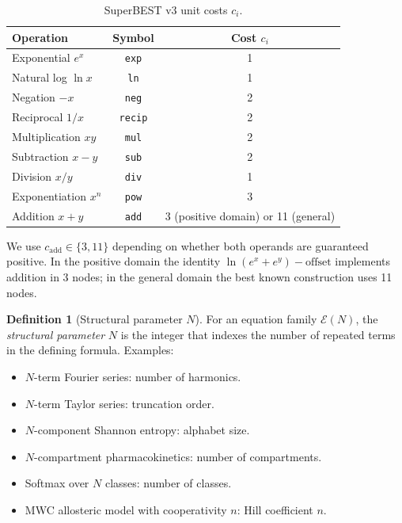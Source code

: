 \documentclass[12pt,a4paper]{article}
\theoremstyle{definition}
\newtheorem{definition}[theorem]{Definition}
\begin{document}
\begin{table}[h]
\centering
\caption{SuperBEST v3 unit costs $c_i$.}
\label{tab:superbest3}
\smallskip
\begin{tabular}{@{}lcc@{}}
\toprule
\textbf{Operation} & \textbf{Symbol} & \textbf{Cost $c_i$} \\
\midrule
Exponential $e^x$    & \texttt{exp}   & 1 \\
Natural log $\ln x$  & \texttt{ln}    & 1 \\
Negation $-x$        & \texttt{neg}   & 2 \\
Reciprocal $1/x$     & \texttt{recip} & 2 \\
Multiplication $xy$  & \texttt{mul}   & 2 \\
Subtraction $x-y$    & \texttt{sub}   & 2 \\
Division $x/y$       & \texttt{div}   & 1 \\
Exponentiation $x^n$ & \texttt{pow}   & 3 \\
Addition $x+y$       & \texttt{add}   & 3 (positive domain) or 11 (general) \\
\bottomrule
\end{tabular}
\end{table}

\noindent
We use $c_{\mathrm{add}} \in \{3, 11\}$ depending on whether both operands
are guaranteed positive.  In the positive domain the identity
$\ln(e^x + e^y) - \text{offset}$ implements addition in 3 nodes; in the
general domain the best known construction uses 11 nodes.

\medskip

\begin{definition}[Structural parameter $N$]
\label{def:N}
For an equation family $\mathcal{E}(N)$, the \emph{structural parameter}
$N$ is the integer that indexes the number of repeated terms in the
defining formula.  Examples:
\begin{itemize}
  \item $N$-term Fourier series: number of harmonics.
  \item $N$-term Taylor series: truncation order.
  \item $N$-component Shannon entropy: alphabet size.
  \item $N$-compartment pharmacokinetics: number of compartments.
  \item Softmax over $N$ classes: number of classes.
  \item MWC allosteric model with cooperativity $n$: Hill coefficient $n$.
\end{itemize}
\end{definition}
\end{document}
